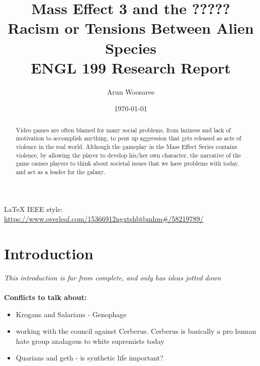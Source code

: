\documentclass[journal]{IEEEtran}
\title{Mass Effect 3 and the ????? Racism or Tensions Between Alien Species\\
\vspace{.25cm}\large ENGL 199 Research Report \vspace{-.5cm}}
\author{\LARGE Arun Woosaree}
\date{\today}
\begin{document}
\maketitle %

\begin{abstract}
 Video games are often blamed for many social problems, from laziness and lack of motivation to accomplish anything, to pent up aggression that gets released as acts of violence in the real world. Although the gameplay in the Mass Effect Series contains violence, by allowing the player to develop his/her own character, the narrative of the game causes players to think about societal issues that we have problems with today, and act as a leader for the galaxy.
\end{abstract}

\LaTeX{} IEEE style:
\url{https://www.overleaf.com/15366912ngxtshbtbmhm#/58219789/}
\section{Introduction}
\textit{This introduction is far from complete, and only has ideas jotted down}
\\ \\
\textbf{Conflicts to talk about:}
\begin{itemize}
 \item Krogans and Salarians - Genophage
 \item working with the council against Cerberus. Cerberus is basically a pro human hate group analagous to white supremists today
 \item Quarians and geth - is synthetic life important?
\end{itemize}
\end{document}
